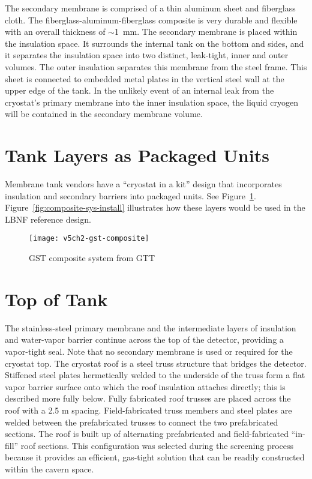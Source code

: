 The secondary membrane is comprised of a thin aluminum sheet and 
fiberglass cloth. The fiberglass-aluminum-fiberglass composite is 
very durable and flexible with an overall thickness of $\sim$1~mm.  
The secondary membrane is placed within the insulation space. It 
surrounds the internal tank on the bottom and sides, and it 
separates the insulation space into two distinct, leak-tight, 
inner and outer volumes. The outer insulation separates this 
membrane from the steel frame. This sheet is connected to embedded 
metal plates in the vertical steel wall at the upper edge of
the tank. In the unlikely event of an internal leak from the 
cryostat's primary membrane into the inner insulation space, the liquid cryogen will be contained in the 
secondary membrane volume.  

\section{Tank Layers as Packaged Units}
Membrane tank vendors have a ``cryostat in a kit'' design that 
incorporates insulation and secondary barriers into packaged units. See Figure~\ref{fig:gst-composite}.  
Figure~\ref{fig:composite-sys-install} illustrates how these layers would be used in the LBNF reference design.

\begin{figure}[htbp]
\centering
\texttt{[image: v5ch2-gst-composite]}
\caption{GST composite system from GTT}
\label{fig:gst-composite}
\end{figure}

\section{Top of Tank}

The stainless-steel primary membrane and the intermediate layers of 
insulation and water-vapor barrier continue across the top of the 
detector, providing a vapor-tight seal.  Note that no secondary 
membrane is used or required for the cryostat top. The cryostat 
roof is a steel truss structure that bridges the detector. Stiffened 
steel plates hermetically welded to the underside of the truss form 
a flat vapor barrier surface onto which the roof insulation attaches 
directly; this is described more fully below. Fully fabricated roof
trusses are placed across the roof with a 2.5 m spacing. Field-fabricated 
truss members and steel plates are welded between the prefabricated 
trusses to connect the two prefabricated sections.  The roof is built 
up of alternating prefabricated and field-fabricated ``in-fill'' roof 
sections.  This configuration was selected during the screening process 
because it provides an efficient, gas-tight solution that can be 
readily constructed within the cavern space.

